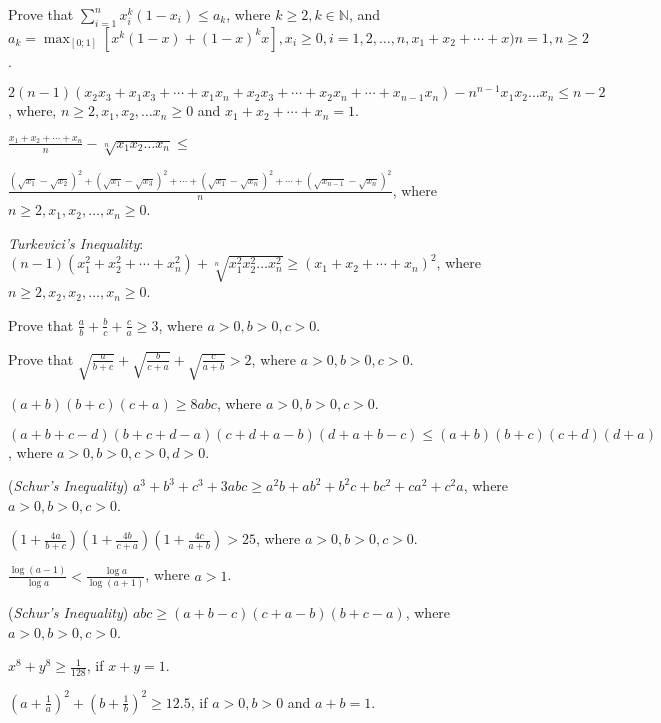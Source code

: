 \item Prove that $\displaystyle\sum_{i=1}^nx_i^k(1 - x_i)\leq a_k$, where $k\geq 2, k\in\mathbb{N}$, and
  $a_k = \displaystyle\max_{[0;1]}[x^k(1 -
  x) + (1 - x)^kx], x_i\geq 0, i=1, 2, \ldots, n, x_1 + x_2 + \cdots + x)n = 1, n\geq 2$.
\item $2(n - 1)(x_2x_3 + x_1x_3 + \cdots + x_1x_n + x_2x_3 + \cdots + x_2x_n + \cdots + x_{n - 1}x_n) - n^{n - 1}x_1x_2\ldots
  x_n\leq n - 2$, where, $n\geq 2, x_1, x_2, \ldots x_n\geq 0$ and $x_1 + x_2 + \cdots + x_n = 1$.
\item $\frac{x_1 + x_2 + \cdots + x_n}{n} - \sqrt[n]{x_1x_2\ldots x_n}\leq$

  $\frac{(\sqrt{x_1} - \sqrt{x_2})^2 + (\sqrt{x_1} -
  \sqrt{x_3})^2 + \cdots + (\sqrt{x_1} - \sqrt{x_n})^2 + \cdots + (\sqrt{x_{n - 1}} - \sqrt{x_n})^2}{n}$, where $n\geq 2, x_1, x_2,
  \ldots, x_n\geq 0$.
\item {\it Turkevici's Inequality}: $(n - 1)(x_1^2 + x_2^2 + \cdots + x_n^2) + \sqrt[n]{x_1^2x_2^2\ldots x_n^2}\geq (x_1 + x_2 +
  \cdots + x_n)^2$, where $n\geq 2, x_2, x_2, \ldots, x_n\geq 0$.
\item Prove that $\frac{a}{b} + \frac{b}{c} + \frac{c}{a}\geq 3$, where $a > 0, b > 0, c > 0$.
\item Prove that $\sqrt{\frac{a}{b + c}} + \sqrt{\frac{b}{c + a}} + \sqrt{\frac{c}{a + b}} > 2$, where $a >
  0, b > 0, c > 0$.
\item $(a + b)(b + c)(c + a)\geq 8abc$, where $a>0, b>0, c>0$.
\item $(a + b + c - d)(b + c + d - a)(c + d + a - b)(d + a + b - c)\leq (a + b)(b + c)(c + d)(d + a)$, where $a > 0, b > 0, c > 0,
  d > 0$.
\item ({\it Schur's Inequality}) $a^3 + b^3 + c^3 + 3abc \geq a^2b + ab^2 + b^2c + bc^2 + ca^2 + c^2a$, where $a > 0, b > 0, c > 0$.
\item $\left(1 + \frac{4a}{b + c}\right)\left(1 + \frac{4b}{c + a}\right)\left(1 + \frac{4c}{a + b}\right) > 25$, where $a > 0, b >
  0, c > 0$.
\item $\frac{\log(a - 1)}{\log a} < \frac{\log a}{\log(a + 1)}$, where $a > 1$.
\item ({\it Schur's Inequality}) $abc \geq (a + b - c)(c + a - b)(b + c - a)$, where $a>0, b>0, c>0$.
\item $x^8 + y^8 \geq \frac{1}{128}$, if $x + y = 1$.
\item $\left(a + \frac{1}{a}\right)^2 + \left(b + \frac{1}{b}\right)^2\geq 12.5$, if $a > 0, b > 0$ and $a + b = 1$.
